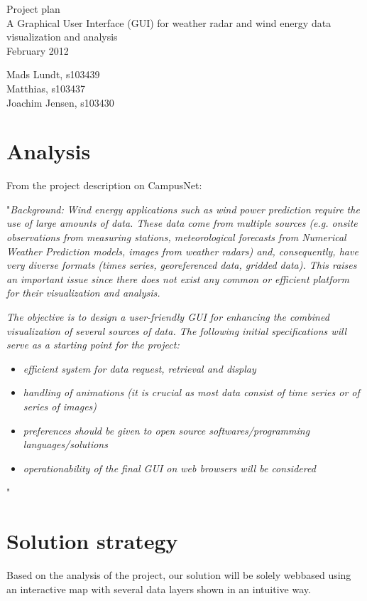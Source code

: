 \documentclass[10pt,a4paper]{article}
\begin{document}
\begin{center}
\Huge{Project plan}\\[.2cm]
\Large{A Graphical User Interface (GUI) for weather radar and wind energy data visualization and analysis}\\[.2cm]
February 2012
\end{center}
Mads Lundt, s103439\\
Matthias, s103437\\
Joachim Jensen, s103430

\section{Analysis}
From the project description on CampusNet:

"\emph{Background: Wind energy applications such as wind power prediction require the use of large amounts of data. These data come from multiple sources (e.g. onsite observations from measuring stations, meteorological forecasts from Numerical Weather Prediction models, images from weather radars) and, consequently, have very diverse formats (times series, georeferenced data, gridded data). This raises an important issue since there does not exist any common or efficient platform for their visualization and analysis.}

\emph{The objective is to design a user-friendly GUI for enhancing the combined visualization of several sources of data. The following initial specifications will serve as a starting point for the project: }
\begin{itemize}
\item \emph{efficient system for data request, retrieval and display}
\item \emph{handling of animations (it is crucial as most data consist of  time series or of series of images)}
\item \emph{preferences should be given to open source softwares/programming languages/solutions}
\item \emph{operationability of the final GUI on web browsers will be considered}
\end{itemize} 
"

\section{Solution strategy}
Based on the analysis of the project, our solution will be solely webbased using an interactive map with several data layers shown in an intuitive way.
\end{document}
